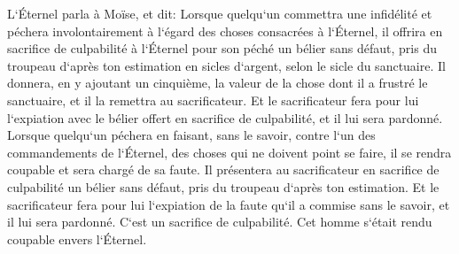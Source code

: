 \verse L`Éternel parla à Moïse, et dit: 
\verse Lorsque quelqu`un commettra une infidélité et péchera involontairement à l`égard des choses consacrées à l`Éternel, il offrira en sacrifice de culpabilité à l`Éternel pour son péché un bélier sans défaut, pris du troupeau d`après ton estimation en sicles d`argent, selon le sicle du sanctuaire. 
\verse Il donnera, en y ajoutant un cinquième, la valeur de la chose dont il a frustré le sanctuaire, et il la remettra au sacrificateur. Et le sacrificateur fera pour lui l`expiation avec le bélier offert en sacrifice de culpabilité, et il lui sera pardonné. 
\verse Lorsque quelqu`un péchera en faisant, sans le savoir, contre l`un des commandements de l`Éternel, des choses qui ne doivent point se faire, il se rendra coupable et sera chargé de sa faute. 
\verse Il présentera au sacrificateur en sacrifice de culpabilité un bélier sans défaut, pris du troupeau d`après ton estimation. Et le sacrificateur fera pour lui l`expiation de la faute qu`il a commise sans le savoir, et il lui sera pardonné. 
\verse C`est un sacrifice de culpabilité. Cet homme s`était rendu coupable envers l`Éternel. 

